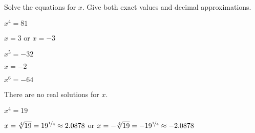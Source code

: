 \begin{essentialskills}
	\begin{problem}
	Solve the equations for $x$.  Give both exact values and decimal approximations.
	\begin{multicols}{4}
		\begin{subproblem}
			$x^4=81$
			\begin{shortsolution}
				$x= 3$ or $x=-3$
			\end{shortsolution}
		\end{subproblem}
		\begin{subproblem}
			$x^5=-32$
			\begin{shortsolution}
				$x= -2$
			\end{shortsolution}
		\end{subproblem}
		\begin{subproblem}
			$x^6=-64$
			\begin{shortsolution}
				There are no real solutions for $x$.
			\end{shortsolution}
		\end{subproblem}
		\begin{subproblem}
			$x^4=19$
			\begin{shortsolution}
				$x= \sqrt[4]{19}=19^{\nicefrac14}\approx 2.0878$ or $x= -\sqrt[4]{19}=-19^{\nicefrac14}\approx -2.0878$
			\end{shortsolution}
		\end{subproblem}
	\end{multicols}
	\end{problem}
\end{essentialskills}
			
